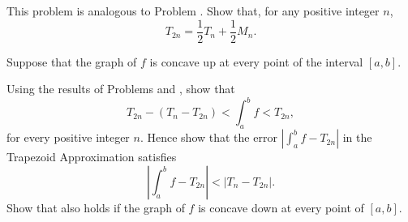 \begin{exercises}
This problem is analogous to Problem .
Show that, for any positive integer $n$,
\[
T_{2n} = \frac12T_n + \frac12M_n
.
\]

Suppose that the graph of $f$ is concave
up at every point of the interval $[a,b]$.
\begin{exenum}
\x
Using the results of Problems 
and , show that
\[
T_{2n} - (T_n - T_{2n}) < \int_a^b f<T_{2n}
,
\]
for every positive integer $n$.
\x
{}
Hence show that the error $|\int_a^b f-T_{2n}|$
in the Trapezoid Approximation satisfies
\[
\left| \int_a^b f-T_{2n}\right|
< |T_n - T_{2n}|
.
\]
\x
Show that  also holds if the graph
of $f$ is concave down at every point of
$[a,b]$.
\end{exenum}

\end{exercises}
